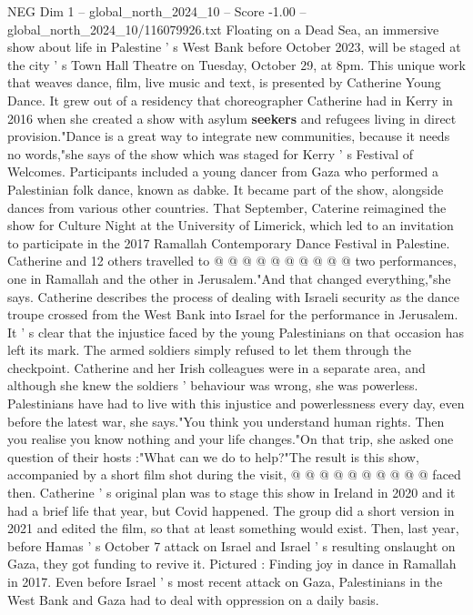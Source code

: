 \begin{textsample}{NEG Dim 1 – global\_north\_2024\_10 – Score -1.00 – global\_north\_2024\_10/116079926.txt}  \label{ex:f1_neg_367}
Floating on a Dead Sea, an immersive show about life in Palestine ' s West Bank before October 2023, will be staged at the city ' s Town Hall Theatre on Tuesday, October 29, at 8pm.
This unique work that weaves dance, film, live music and text, is presented by Catherine Young Dance.
It grew out of a residency that choreographer Catherine had in Kerry in 2016 when she created a show with asylum \textbf{seekers} and refugees living in direct provision."Dance is a great way to integrate new communities, because it needs no words,"she says of the show which was staged for Kerry ' s Festival of Welcomes.
Participants included a young dancer from Gaza who performed a Palestinian folk dance, known as dabke.
It became part of the show, alongside dances from various other countries.
That September, Caterine reimagined the show for Culture Night at the University of Limerick, which led to an invitation to participate in the 2017 Ramallah Contemporary Dance Festival in Palestine.
Catherine and 12 others travelled to @ @ @ @ @ @ @ @ @ @ two performances, one in Ramallah and the other in Jerusalem."And that changed everything,"she says.
Catherine describes the process of dealing with Israeli security as the dance troupe crossed from the West Bank into Israel for the performance in Jerusalem.
It ' s clear that the injustice faced by the young Palestinians on that occasion has left its mark.
The armed soldiers simply refused to let them through the checkpoint.
Catherine and her Irish colleagues were in a separate area, and although she knew the soldiers ' behaviour was wrong, she was powerless.
Palestinians have had to live with this injustice and powerlessness every day, even before the latest war, she says."You think you understand human rights.
Then you realise you know nothing and your life changes."On that trip, she asked one question of their hosts :"What can we do to help?"The result is this show, accompanied by a short film shot during the visit, @ @ @ @ @ @ @ @ @ @ faced then.
Catherine ' s original plan was to stage this show in Ireland in 2020 and it had a brief life that year, but Covid happened.
The group did a short version in 2021 and edited the film, so that at least something would exist.
Then, last year, before Hamas ' s October 7 attack on Israel and Israel ' s resulting onslaught on Gaza, they got funding to revive it.
Pictured : Finding joy in dance in Ramallah in 2017.
Even before Israel ' s most recent attack on Gaza, Palestinians in the West Bank and Gaza had to deal with oppression on a daily basis.

\end{textsample}
